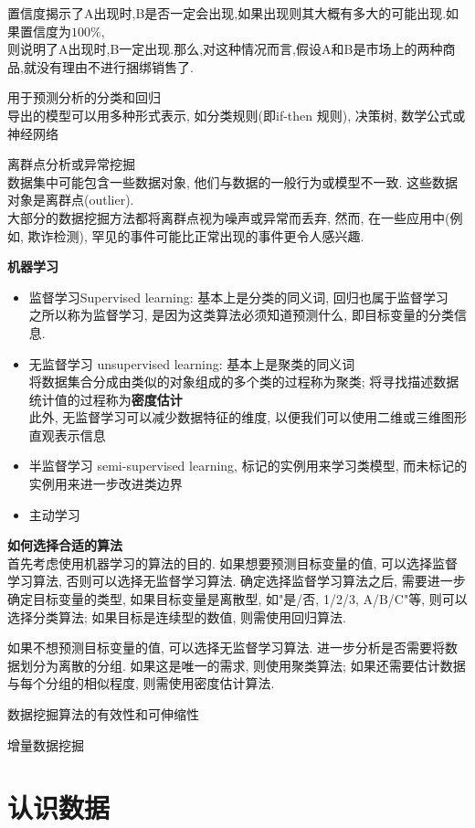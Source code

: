 \documentclass{article}
\begin{document}
置信度揭示了A出现时,B是否一定会出现,如果出现则其大概有多大的可能出现.如果置信度为$100\%$,\\
则说明了A出现时,B一定出现.那么,对这种情况而言,假设A和B是市场上的两种商品,就没有理由不进行捆绑销售了.

用于预测分析的分类和回归\\
导出的模型可以用多种形式表示, 如分类规则(即if-then 规则), 决策树, 数学公式或神经网络\par
离群点分析或异常挖掘\\
数据集中可能包含一些数据对象, 他们与数据的一般行为或模型不一致. 这些数据对象是离群点(outlier).\\
大部分的数据挖掘方法都将离群点视为噪声或异常而丢弃, 然而, 在一些应用中(例如, 欺诈检测), 罕见的事件可能比正常出现的事件更令人感兴趣.

\textbf{机器学习}
\begin{itemize}
\item 监督学习Supervised learning: 基本上是分类的同义词, 回归也属于监督学习\\
	 之所以称为监督学习, 是因为这类算法必须知道预测什么, 即目标变量的分类信息.
\item 无监督学习 unsupervised learning: 基本上是聚类的同义词\\
		将数据集合分成由类似的对象组成的多个类的过程称为聚类; 将寻找描述数据统计值的过程称为\textbf{密度估计}\\
		此外, 无监督学习可以减少数据特征的维度, 以便我们可以使用二维或三维图形直观表示信息
\item 半监督学习 semi-supervised learning, 标记的实例用来学习类模型, 而未标记的实例用来进一步改进类边界
\item 主动学习
\end{itemize}

\textbf{如何选择合适的算法}\\
首先考虑使用机器学习的算法的目的. 如果想要预测目标变量的值, 可以选择监督学习算法, 否则可以选择无监督学习算法.
确定选择监督学习算法之后, 需要进一步确定目标变量的类型, 如果目标变量是离散型, 如"是/否, 1/2/3, A/B/C"等, 则可以选择分类算法;
如果目标是连续型的数值, 则需使用回归算法.

如果不想预测目标变量的值, 可以选择无监督学习算法. 进一步分析是否需要将数据划分为离散的分组. 如果这是唯一的需求, 则使用聚类算法; 
如果还需要估计数据与每个分组的相似程度, 则需使用密度估计算法.

\bigskip
数据挖掘算法的有效性和可伸缩性\par
增量数据挖掘

\section{认识数据}
\end{document}

